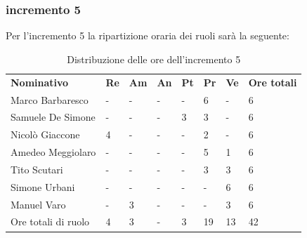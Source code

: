 \subsubsection{incremento 5}
Per l'incremento 5 la ripartizione oraria dei ruoli sarà la seguente:
\begin{center}
    \begin{table}[ht!]
        \centering
        \caption{Distribuzione delle ore dell'incremento 5}
        \vspace{5px}
        \renewcommand{\arraystretch}{1.8}
        \begin{tabular}{p{100px} p{20px} p{20px} p{20px} p{20px} p{20px} p{20px} p{50px} }
            \rowcolor{logo!70} \textbf{Nominativo} & \textbf{Re} & \textbf{Am} & \textbf{An} & \textbf{Pt} & \textbf{Pr} & \textbf{Ve} & \textbf{Ore totali} \\
            Marco Barbaresco                       & -           & -           & -           & -           & 6           & -           & 6                   \\
            Samuele De Simone                      & -           & -           & -           & 3           & 3           & -           & 6                   \\
            Nicolò Giaccone                        & 4           & -           & -           & -           & 2           & -           & 6                   \\
            Amedeo Meggiolaro                      & -           & -           & -           & -           & 5           & 1           & 6                   \\
            Tito Scutari                           & -           & -           & -           & -           & 3           & 3           & 6                   \\
            Simone Urbani                          & -           & -           & -           & -           & -           & 6           & 6                   \\
            Manuel Varo                            & -           & 3           & -           & -           & -           & 3           & 6                   \\
            Ore totali di ruolo                    & 4           & 3           & -           & 3           & 19          & 13          & 42                  \\
        \end{tabular}
    \end{table}
\end{center}
